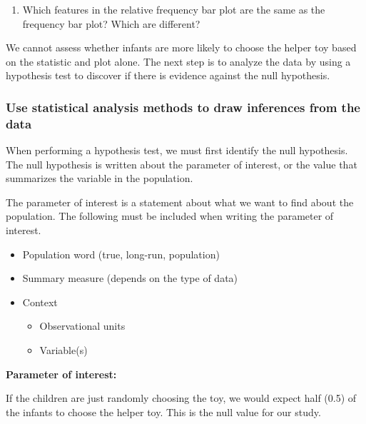 \documentclass[
]{report}
\providecommand{\tightlist}{%
  \setlength{\itemsep}{0pt}\setlength{\parskip}{0pt}}
\begin{document}
\begin{enumerate}
\def\labelenumi{\arabic{enumi}.}
\setcounter{enumi}{3}
\tightlist
\item
  Which features in the relative frequency bar plot are the same as the frequency bar plot? Which are different?
\end{enumerate}

\vspace{0.5in}

We cannot assess whether infants are more likely to choose the helper toy based on the statistic and plot alone. The next step is to analyze the data by using a hypothesis test to discover if there is evidence against the null hypothesis.

\subsubsection*{Use statistical analysis methods to draw inferences from the data}\label{use-statistical-analysis-methods-to-draw-inferences-from-the-data}

When performing a hypothesis test, we must first identify the null hypothesis. The null hypothesis is written about the parameter of interest, or the value that summarizes the variable in the population.

The parameter of interest is a statement about what we want to find about the population. The following must be included when writing the parameter of interest.

\begin{itemize}
\item
  Population word (true, long-run, population)
\item
  Summary measure (depends on the type of data)
\item
  Context

  \begin{itemize}
  \item
    Observational units
  \item
    Variable(s)
  \end{itemize}
\end{itemize}

\textbf{Parameter of interest:}

\vspace{0.5in}

If the children are just randomly choosing the toy, we would expect half (0.5) of the infants to choose the helper toy. This is the null value for our study.
\end{document}
